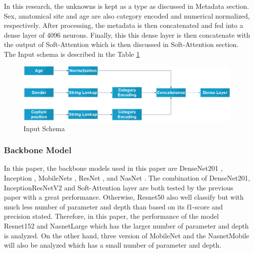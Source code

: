 \documentclass[sensors,article,submit,pdftex,moreauthors]{Definitions/mdpi}
\begin{document}
In this research, the unknowns is kept as a type as discussed in Metadata section. Sex, anatomical site and age are also category encoded and numerical normalized, respectively. After processing, the metadata is then concatenated and fed into a dense layer of 4096 neurons. Finally, this this dense layer is then concatenate with the output of Soft-Attention which is then discussed in Soft-Attention section. The Input schema is described in the Table \ref{fig:input-schema}

\begin{figure}[H]
	\centering
	\includegraphics[width=1\linewidth]{"Definitions/Input Schema"}
	\caption{Input Schema}
	\label{fig:input-schema}
\end{figure}

\subsubsection{Backbone Model}
In this paper, the backbone models used in this paper are DenseNet201 \cite{06993}, Inception \cite{00567}, MobileNets \cite{04861} \cite{04381} \cite{02244}, ResNet \cite{03385} \cite{05027}, and NasNet \cite{07012}. The combination of DenseNet201, InceptionResNetV2 and Soft-Attention layer are both tested by the previous paper \cite{03358} with a great performance. Otherwise, Resnet50 also well classify but with much less number of parameter and depth than based on its f1-score and precision stated. Therefore, in this paper, the performance of the model Resnet152 and NasnetLarge which has the larger number of parameter and depth is analyzed. On the other hand, three version of MobileNet and the NasnetMobile will also be analyzed which has a small number of parameter and depth. 
\end{document}
